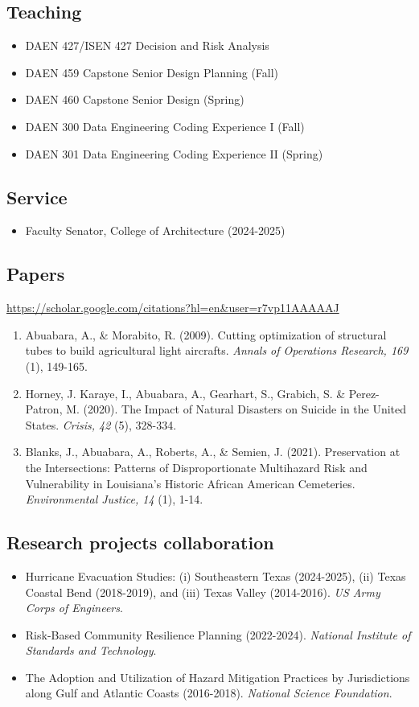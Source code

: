 \documentclass[11pt]{article}
\begin{document}
\subsection*{Teaching}
\begin{itemize}[leftmargin=20pt]
\item DAEN 427/ISEN 427 Decision and Risk Analysis
\item DAEN 459 Capstone Senior Design Planning (Fall)
\item DAEN 460 Capstone Senior Design (Spring)
\item DAEN 300 Data Engineering Coding Experience I (Fall)
\item DAEN 301 Data Engineering Coding Experience II (Spring)
\end{itemize}

\subsection*{Service}
\begin{itemize}[leftmargin=20pt]
\item Faculty Senator, College of Architecture (2024-2025)
\end{itemize}

\subsection*{Papers}
\url{https://scholar.google.com/citations?hl=en&user=r7vp11AAAAAJ}
\begin{enumerate}[leftmargin=20pt]
\item Abuabara, A., \& Morabito, R. (2009). Cutting optimization of structural tubes to build agricultural light aircrafts. \emph{Annals of Operations Research, 169} (1), 149-165.
\item Horney, J. Karaye, I., Abuabara, A., Gearhart, S., Grabich, S. \& Perez-Patron, M. (2020). The Impact of Natural Disasters on Suicide in the United States. \emph{Crisis, 42} (5), 328-334.
\item Blanks, J., Abuabara, A., Roberts, A., \& Semien, J. (2021). Preservation at the Intersections: Patterns of Disproportionate Multihazard Risk and Vulnerability in Louisiana's Historic African American Cemeteries. \emph{Environmental Justice, 14} (1), 1-14.
\end{enumerate}

\subsection*{Research projects collaboration}
\begin{itemize}[leftmargin=20pt]
\item Hurricane Evacuation Studies: (i) Southeastern Texas (2024-2025), (ii) Texas Coastal Bend (2018-2019), and (iii) Texas Valley (2014-2016). \emph{US Army Corps of Engineers}.
\item Risk-Based Community Resilience Planning (2022-2024). \emph{National Institute of Standards and Technology}.
\item The Adoption and Utilization of Hazard Mitigation Practices by Jurisdictions along Gulf and Atlantic Coasts (2016-2018). \emph{National Science Foundation}.
\end{itemize}
\end{document}
